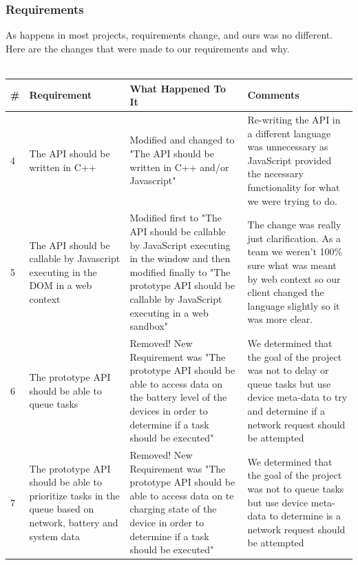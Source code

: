 \documentclass[12pt]{article}
\begin{document}
\subsubsection{Requirements}
As happens in most projects, requirements change, and ours was no different. Here are the changes that were made to our requirements and why.\\\\
\begin{tabularx}{\textwidth}{|p{1cm}|X|X|X|}
\hline
\#  & Requirement 				& What Happened To It & Comments \\ \hline
4 & The API should be written in C++ & Modified and changed to "The API should be written in C++ and/or Javascript" & Re-writing the API in a different language was unnecessary as JavaScript provided the necessary functionality for what we were trying to do. \\ \hline
5 & The API should be callable by Javascript executing in the DOM in a web context & Modified first to "The API should be callable by JavaScript executing in the window and then modified finally to "The prototype API should be callable by JavaScript executing in a web sandbox" & The change was really just clarification.  As a team we weren't 100\% sure what was meant by web context so our client changed the language slightly so it was more clear. \\ \hline
6 & The prototype API should be able to queue tasks & Removed! New Requirement was "The prototype API should be able to access data on the battery level of the devices in order to determine if a task should be executed" & We determined that the goal of the project was not to delay or queue tasks but use device meta-data to try and determine if a network request should be attempted \\ \hline
7 & The prototype API should be able to prioritize tasks in the queue based on network, battery and system data & Removed! New Requirement was "The prototype API should be able to access data on te charging state of the device in order to determine if a task should be executed" & We determined that the goal of the project was not to queue tasks but use device meta-data to determine is a network request should be attempted \\ \hline
\end{tabularx}
\pagebreak
\end{document}
